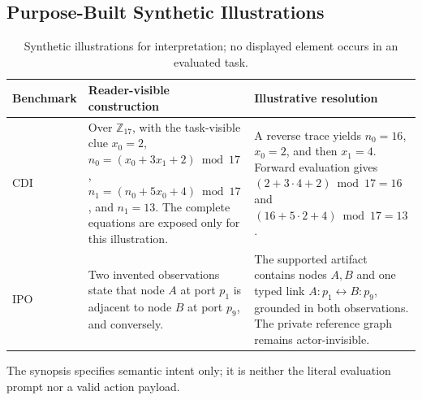 \subsection{Purpose-Built Synthetic Illustrations}
\begin{table}[H]
\centering
\normalsize
\renewcommand{\arraystretch}{1.18}
\caption{Synthetic illustrations for interpretation; no displayed element occurs in an evaluated task.}
\label{tab:synthetic-examples}
\begin{tabularx}{0.95\textwidth}{@{}p{} X X@{}}
\toprule
\textbf{Benchmark} & \textbf{Reader-visible construction} & \textbf{Illustrative resolution} \\
\midrule
CDI & Over $\mathbb Z_{17}$, with the task-visible clue $x_0=2$,
$n_0=(x_0+3x_1+2)\bmod17$,
$n_1=(n_0+5x_0+4)\bmod17$, and $n_1=13$.
The complete equations are exposed only for this illustration. & A reverse trace yields $n_0=16$, $x_0=2$, and then $x_1=4$. Forward evaluation gives
$(2+3\cdot4+2)\bmod17=16$ and
$(16+5\cdot2+4)\bmod17=13$. \\
IPO & Two invented observations state that node $A$ at port $p_1$ is adjacent to node $B$ at port $p_9$, and conversely. & The supported artifact contains nodes $A,B$ and one typed link
$A{:}p_1\leftrightarrow B{:}p_9$, grounded in both observations. The private reference graph remains actor-invisible. \\
\bottomrule
\end{tabularx}
\end{table}
The synopsis specifies semantic intent only; it is neither the literal evaluation prompt nor a valid action payload.
